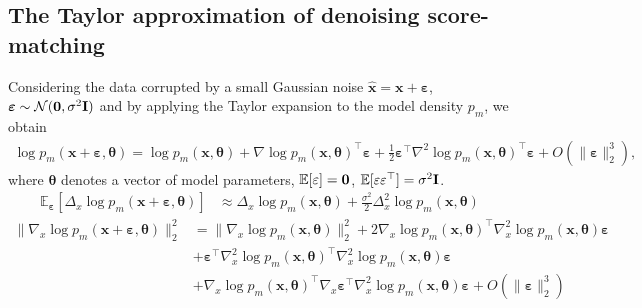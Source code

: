 \subsection{The Taylor approximation of denoising score-matching}
\label{sec:Taylor}
    Considering the data corrupted by a small Gaussian noise $\hat{\mathbf{x}} = \mathbf{x} + {\bm \varepsilon}$, ${\bm \varepsilon}\sim {\cal N}(\mathbf{0}, \sigma^2 \mathbf{I})$ and by applying the Taylor expansion to the model density $p_m$, we obtain
    \begin{align*}
        \log p_m(\mathbf{x} + {\bm \varepsilon}, {\bm \theta}) = \log p_m(\mathbf{x}, {\bm \theta}) + \nabla\log p_m(\mathbf{x}, {\bm \theta})^{\top}{\bm \varepsilon} + \frac{1}{2}{\bm \varepsilon}^{\top}\nabla^2\log p_m(\mathbf{x}, {\bm \theta})^{\top}{\bm \varepsilon} + O(\|{\bm \varepsilon}\|_2^3),
    \end{align*}
    where ${\bm \theta}$ denotes a vector of model parameters, $\mathbb{E}[\varepsilon] = {\bf 0}$, $\mathbb{E}[\varepsilon\varepsilon^{\top}] = \sigma^2 {\bf I}$.
    \begin{align*}
        \mathbb{E}_{{\bm \varepsilon}}[\Delta_x\log p_m(\mathbf{x} + {\bm \varepsilon}, {\bm \theta})]
        &\approx \Delta_x \log p_m(\mathbf{x}, {\bm \theta}) + \frac{\sigma^2}{2}\Delta^2_x \log p_m(\mathbf{x}, {\bm \theta})
    \end{align*}
    \begin{align*}
        \|\nabla_x\log p_m(\mathbf{x} + {\bm \varepsilon}, {\bm \theta})\|_2^2
        &=\|\nabla_x\log p_m(\mathbf{x}, {\bm \theta})\|_2^2
        + 2\nabla_x\log p_m(\mathbf{x}, {\bm \theta})^{\top}\nabla_x^2\log p_m(\mathbf{x}, {\bm \theta}){\bm \varepsilon}\\
        &+ {\bm \varepsilon}^{\top}\nabla_x^2\log p_m(\mathbf{x}, {\bm \theta})^{\top}\nabla_x^2\log p_m(\mathbf{x}, {\bm \theta}){\bm \varepsilon}\\
        &+ \nabla_x\log p_m(\mathbf{x}, {\bm \theta})^{\top}\nabla_x{\bm \varepsilon}^{\top}\nabla_x^2\log p_m(\mathbf{x}, {\bm \theta}){\bm \varepsilon} + O(\|{\bm \varepsilon}\|_2^3)
    \end{align*}
